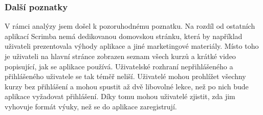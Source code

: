 \subsubsection{Další poznatky}

V rámci analýzy jsem došel k pozoruhodnému poznatku. Na rozdíl od ostatních aplikací Scrimba nemá dedikovanou domovskou stránku, která by například uživateli prezentovala výhody aplikace a jiné marketingové materiály. Místo toho je uživateli na hlavní stránce zobrazen seznam všech kurzů a krátké video popisující, jak se aplikace používá. Uživatelské rozhraní nepřihlášeného a přihlášeného uživatele se tak téměř neliší. Uživatelé mohou prohlížet všechny kurzy bez přihlášení a mohou spustit až dvě libovolné lekce, než po nich bude aplikace vyžadovat přihlášení. Díky tomu mohou uživatelé zjistit, zda jim vyhovuje formát výuky, než se do aplikace zaregistrují.
